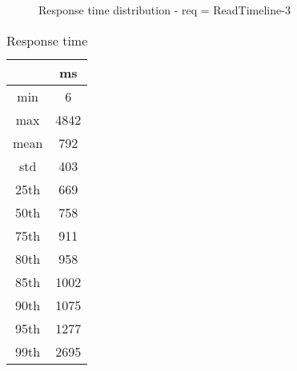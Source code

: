 \begin{minipage}{0.75\linewidth}
\begin{figure}[h]
\begin{adjustbox}{max width=1.0\linewidth, keepaspectratio}
  \end{adjustbox}
  \caption{Response time distribution - req = ReadTimeline-3}
\end{figure}
\end{minipage}\hfill\begin{minipage}{0.18\linewidth}
\begin{table}[h]
\begin{tabular}{|cc|}
\hline
\textbf{} & \textbf{ms}\\ \hline
 \Xhline{0.005\arrayrulewidth}
min & 6\\
 \Xhline{0.005\arrayrulewidth}
max & 4842\\
 \Xhline{0.005\arrayrulewidth}
mean & 792\\
 \Xhline{0.005\arrayrulewidth}
std & 403\\
\hline
\hline
 \Xhline{0.005\arrayrulewidth}
25th & 669\\
 \Xhline{0.005\arrayrulewidth}
50th & 758\\
 \Xhline{0.005\arrayrulewidth}
75th & 911\\
 \Xhline{0.005\arrayrulewidth}
80th & 958\\
 \Xhline{0.005\arrayrulewidth}
85th & 1002\\
 \Xhline{0.005\arrayrulewidth}
90th & 1075\\
 \Xhline{0.005\arrayrulewidth}
95th & 1277\\
 \Xhline{0.005\arrayrulewidth}
99th & 2695\\
\hline
\end{tabular}
\caption{Response time}
\end{table}
\end{minipage}\hfill